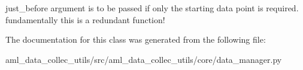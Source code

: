 \begin{DoxyVerb}just_before argument is to be passed if only the starting data point is required.
fundamentally this is a redundant function!
\end{DoxyVerb}
 

The documentation for this class was generated from the following file\+:\begin{DoxyCompactItemize}
\item 
aml\+\_\+data\+\_\+collec\+\_\+utils/src/aml\+\_\+data\+\_\+collec\+\_\+utils/core/data\+\_\+manager.\+py\end{DoxyCompactItemize}

